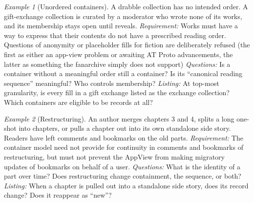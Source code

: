 \documentclass{amsart}
\theoremstyle{remark}
\newtheorem{eg}{Example}
\begin{document}
    \begin{eg}[Unordered containers]\label{eg:unordered}
        A drabble collection has no intended order. A gift-exchange collection is curated by a moderator who wrote none of its works, and its membership stays open until reveals.
        \emph{Requirement:} Works must have a way to express that their contents do not have a prescribed reading order. Questions of anonymity or placeholder fills for fiction are deliberately refused (the first as either an app-view problem or awaiting AT Proto advancements, the latter as something the fanarchive simply does not support)
        \emph{Questions:} Is a container without a meaningful order still a container? Is its ``canonical reading sequence'' meaningful? Who controls membership?
        \emph{Listing:} At top-most granularity, is every fill in a gift exchange listed as the exchange collection? Which containers are eligible to be records at all?
    \end{eg}
    \begin{eg}[Restructuring]\label{eg:restructure}
        An author merges chapters 3 and 4, splits a long one-shot into chapters, or pulls a chapter out into its own standalone side story. Readers have left comments and bookmarks on the old parts.
        \emph{Requirement:} The container model need not provide for continuity in comments and bookmarks of restructuring, but must not prevent the AppView from making migratory updates of bookmarks on behalf of a user.
        \emph{Questions:} What is the identity of a part over time? Does restructuring change containment, the sequence, or both?
        \emph{Listing:} When a chapter is pulled out into a standalone side story, does its record change? Does it reappear as ``new''?
    \end{eg}
\end{document}
